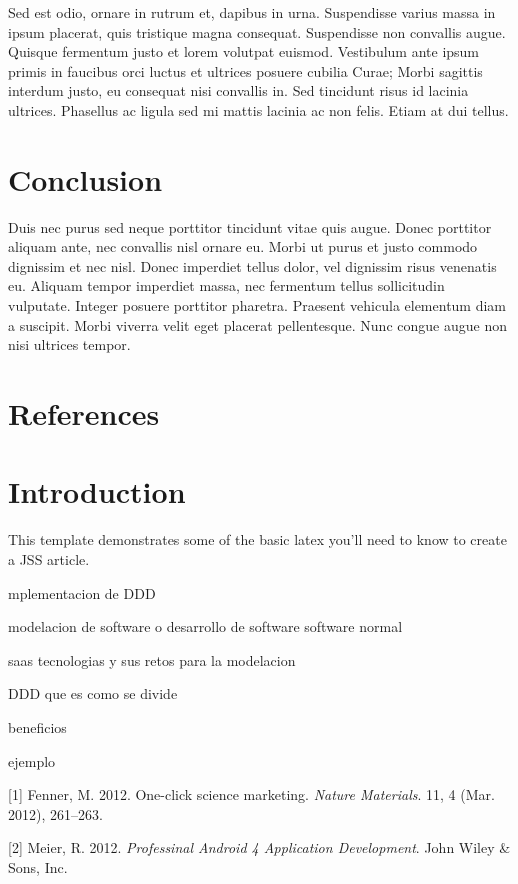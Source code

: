\documentclass{acm_proc_article-sp}
\begin{document}
Sed est odio, ornare in rutrum et, dapibus in urna. Suspendisse varius
massa in ipsum placerat, quis tristique magna consequat. Suspendisse non
convallis augue. Quisque fermentum justo et lorem volutpat euismod.
Vestibulum ante ipsum primis in faucibus orci luctus et ultrices posuere
cubilia Curae; Morbi sagittis interdum justo, eu consequat nisi
convallis in. Sed tincidunt risus id lacinia ultrices. Phasellus ac
ligula sed mi mattis lacinia ac non felis. Etiam at dui tellus.

\section{Conclusion}\label{conclusion}

Duis nec purus sed neque porttitor tincidunt vitae quis augue. Donec
porttitor aliquam ante, nec convallis nisl ornare eu. Morbi ut purus et
justo commodo dignissim et nec nisl. Donec imperdiet tellus dolor, vel
dignissim risus venenatis eu. Aliquam tempor imperdiet massa, nec
fermentum tellus sollicitudin vulputate. Integer posuere porttitor
pharetra. Praesent vehicula elementum diam a suscipit. Morbi viverra
velit eget placerat pellentesque. Nunc congue augue non nisi ultrices
tempor.

\section{References}\label{references}

\section{Introduction}\label{introduction-1}

This template demonstrates some of the basic latex you'll need to know
to create a JSS article.

mplementacion de DDD

modelacion de software o desarrollo de software software normal

saas tecnologias y sus retos para la modelacion

DDD que es como se divide

beneficios

ejemplo

\hypertarget{refs}{}
\hypertarget{ref-fenner2012a}{}
{[}1{]} Fenner, M. 2012. One-click science marketing. \emph{Nature
Materials}. 11, 4 (Mar. 2012), 261--263.

\hypertarget{ref-meier2012}{}
{[}2{]} Meier, R. 2012. \emph{Professinal Android 4 Application
Development}. John Wiley \& Sons, Inc.
\setlength{\parindent}{0in}
\end{document}

